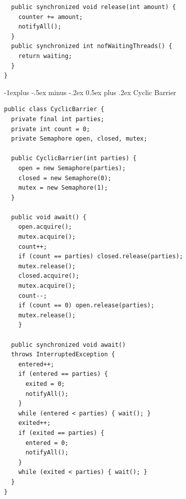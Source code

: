 \documentclass[a4paper, fontsize=6pt]{scrartcl}
\makeatletter
\renewcommand{\subsection}{\@startsection{subsection}{2}{0mm}%
    {-1explus -.5ex minus -.2ex}%
    {0.5ex plus .2ex}%
    {\normalfont\normalsize\bfseries}}
\makeatother
\begin{document}
\begin{multicols*}{5}
\begin{verbatim}
  public synchronized void release(int amount) {
    counter += amount;
    notifyAll();
  }
  public synchronized int nofWaitingThreads() {
    return waiting;
  }
}
\end{verbatim}

\subsection{Cyclic Barrier}
\begin{verbatim}
public class CyclicBarrier {
  private final int parties;
  private int count = 0;
  private Semaphore open, closed, mutex;
    
  public CyclicBarrier(int parties) {
    open = new Semaphore(parties);
    closed = new Semaphore(0);
    mutex = new Semaphore(1);
  }
    
  public void await() {
    open.acquire();
    mutex.acquire();
    count++;
    if (count == parties) closed.release(parties);
    mutex.release();
    closed.acquire();
    mutex.acquire();
    count--;
    if (count == 0) open.release(parties);
    mutex.release();
    }
    
  public synchronized void await() 
  throws InterruptedException {
    entered++;
    if (entered == parties) {
      exited = 0; 
      notifyAll();
    }
    while (entered < parties) { wait(); }
    exited++;
    if (exited == parties) {
      entered = 0;
      notifyAll();
    }
    while (exited < parties) { wait(); }
  }
}
\end{verbatim}

\end{multicols*}
\end{document}
